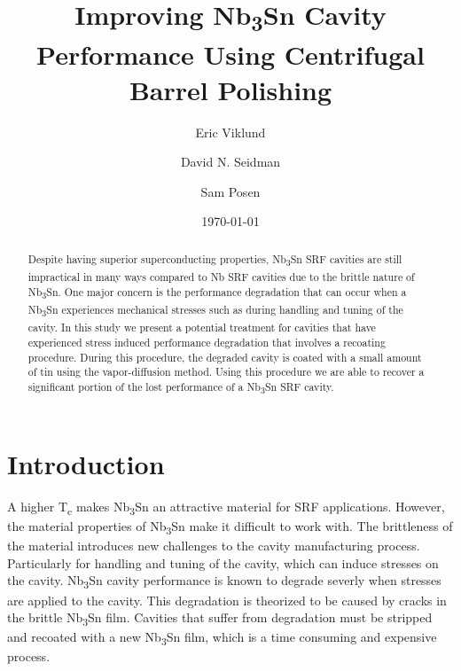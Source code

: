 \documentclass[]{revtex4-2}
\begin{document}
\title{Improving Nb\textsubscript{3}Sn Cavity Performance Using Centrifugal Barrel Polishing}
\author{Eric Viklund}
\author{David N. Seidman}
\author{Sam Posen}


\date{\today}

\begin{abstract}

    Despite having superior superconducting properties, Nb\textsubscript{3}Sn SRF cavities are still impractical in many ways compared to Nb SRF cavities due to the brittle nature of Nb\textsubscript{3}Sn. One major concern is the performance degradation that can occur when a Nb\textsubscript{3}Sn experiences mechanical stresses such as during handling and tuning of the cavity. In this study we present a potential treatment for cavities that have experienced stress induced performance degradation that involves a recoating procedure. During this procedure, the degraded cavity is coated with a small amount of tin using the vapor-diffusion method. Using this procedure we are able to recover a significant portion of the lost performance of a Nb\textsubscript{3}Sn SRF cavity.

\end{abstract}

\maketitle

\section{Introduction}
\label{sec:Introduction}

A higher T\textsubscript{c} makes Nb\textsubscript{3}Sn an attractive material for SRF applications. However, the material properties of Nb\textsubscript{3}Sn make it difficult to work with. The brittleness of the material introduces new challenges to the cavity manufacturing process. Particularly for handling and tuning of the cavity, which can induce stresses on the cavity. Nb\textsubscript{3}Sn cavity performance is known to degrade severly when stresses are applied to the cavity. This degradation is theorized to be caused by cracks in the brittle Nb\textsubscript{3}Sn film. Cavities that suffer from degradation must be stripped and recoated with a new Nb\textsubscript{3}Sn film, which is a time consuming and expensive process.
\end{document}
